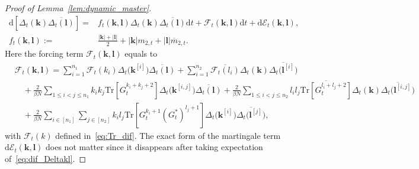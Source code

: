 \documentclass[10pt]{amsart}
\numberwithin{equation}{section}
\newcommand{\dif}{\mathrm{d}}
\newcommand{\Tr}{\mathrm{Tr}}
\begin{document}
\begin{proof}[Proof of Lemma~\ref{lem:dynamic_master}]
\begin{equation}
\begin{split}
\dif \left[\Delta_t(\bm{k})\overline{\Delta_t(\bm{l})}\right] = &f_t(\bm{k},\bm{l}) \Delta_t(\bm{k})\overline{\Delta_t(\bm{l})}\dif t + \mathcal{F}_t(\bm{k},\bm{l})\dif t + \dif \mathcal{E}_t(\bm{k},\bm{l}),\\
f_t(\bm{k},\bm{l}):= &\frac{|\bm{k}|+|\bm{l}|}{2} +|\bm{k}|m_{2,t} + |\bm{l}|\overline{m}_{2,t}.
\end{split}
\label{eq:dif_Deltakl}
\end{equation}
Here the forcing term $\mathcal{F}_t(\bm{k},\bm{l})$ equals to
\begin{equation}
\begin{split}
&\mathcal{F}_t(\bm{k},\bm{l}) = \sum_{i=1}^{n_1}\mathcal{F}_t(k_i)\Delta_t\big(\bm{k}^{[i]}\big) \overline{\Delta_t(\bm{l})} + \sum_{i=1}^{n_2}\overline{\mathcal{F}_t(l_i)}\Delta_t(\bm{k}) \overline{\Delta_t\big(\bm{l}^{[i]}\big)}\\
&\quad+ \frac{2}{\beta N}\!\!\sum_{1\le i<j \le n_1}\!\! k_ik_j \Tr \left[ G_t^{k_i+k_j+2}\right] \Delta_t\big(\bm{k}^{[i,j]}\big)\overline{\Delta_t(\bm{l})} + \frac{2}{\beta N}\!\!\sum_{1\le i<j \le n_2}\!\! l_il_j \overline{\Tr \left[ G_t^{l_i+l_j+2}\right]} \Delta_t(\bm{k})\overline{\Delta_t\big(\bm{l}^{[i,j]}\big)}\\
&\quad+ \frac{2}{\beta N} \sum_{i\in [n_1]}\sum_{j\in [n_2]} k_il_j \Tr\left[ G_t^{k_i+1}(G^*_t)^{l_j+1}\right] \Delta_t\big(\bm{k}^{[i]}\big)\overline{\Delta_t\big(\bm{l}^{[j]}\big)},
\end{split}
\label{eq:F_kl}
\end{equation}
with $\mathcal{F}_t(k)$ defined in~\eqref{eq:Tr_dif}. The exact form of the martingale term $\dif \mathcal{E}_t(\bm{k},\bm{l})$ does not matter since it disappears after taking expectation of~\eqref{eq:dif_Deltakl}.


\end{proof}
\end{document}
